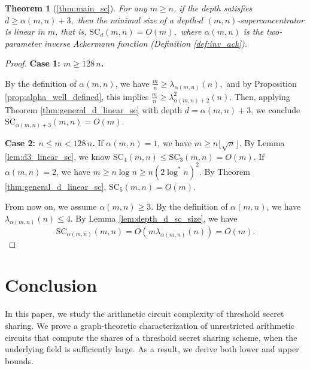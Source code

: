 \documentclass[11pt]{article}
\newtheorem{theorem}{Theorem}
\newcommand{\scsize}{\mathrm{SC}}
\begin{document}
\begin{theorem}[\ref{thm:main_sc}]
For any $m \ge n$, if the depth satisfies 
$
d \ge \alpha(m,n) + 3,
$ 
then the minimal size of a depth-$d$ $(m,n)$-superconcentrator is linear in $m$, that is,
$
\scsize_d(m,n) = O(m),
$ 
where $\alpha(m,n)$ is the two-parameter inverse Ackermann function (Definition \ref{def:inv_ack}).
\end{theorem}

\begin{proof}
\noindent\textbf{Case 1: $m \ge 128\, n$.}  

By the definition of $\alpha(m,n)$, we have
$
\frac{m}{n} \ge \lambda_{\alpha(m,n)}(n),
$ 
and by Proposition \ref{prop:alpha_well_defined}, this implies
$
\frac{m}{n} \ge \lambda_{\alpha(m,n)+2}^{2}(n).
$
Then, applying Theorem \ref{thm:general_d_linear_sc} with depth $d = \alpha(m,n)+3$, we conclude
$
\scsize_{\alpha(m,n)+3}(m,n) = O(m).
$

\medskip
\noindent\textbf{Case 2: $n \le m < 128\, n$.}  If $\alpha(m, n) = 1$, we have $m \ge n \lfloor\sqrt{n} \rfloor$. By Lemma \ref{lem:d3_linear_sc}, we know $\scsize_4(m, n) \le \scsize_3(m, n) = O(m)$. If $\alpha(m, n) = 2$, we have $m \ge n \log n \ge n (2\log^* n)^2$. By Theorem \ref{thm:general_d_linear_sc}, $\scsize_5(m, n) = O(m)$.

From now on, we assume $\alpha(m, n) \ge 3$. By the definition of $\alpha(m, n)$, we have $\lambda_{\alpha(m, n)}(n) \le 4$. By Lemma \ref{lem:depth_d_sc_size}, we have
\[
\scsize_{\alpha(m,n)}(m, n) = O(m \lambda_{\alpha(m, n)}(n)) = O(m).
\]
\end{proof}



\section{Conclusion}

In this paper, we study the arithmetic circuit complexity of threshold secret sharing. We prove a graph-theoretic characterization of unrestricted arithmetic circuits that compute the shares of a threshold secret sharing scheme, when the underlying field is sufficiently large. As a result, we derive both lower and upper bounds.
\end{document}
